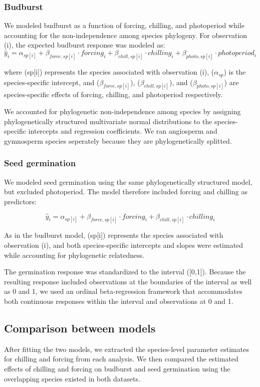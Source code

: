 \documentclass{article}
\begin{document}
\subsubsection{Budburst}
We modeled budburst as a function of forcing, chilling, and photoperiod while accounting for the non-independence among species phylogeny. For observation (i), the expected budburst response was modeled as:
\[
\hat{y}_i = \alpha_{sp[i]} + \beta_{force,sp[i]} \cdot forcing_i + \beta_{chill,sp[i]} \cdot chilling_i + \beta_{photo,sp[i]} \cdot photoperiod_i
\]

where (sp[i]) represents the species associated with observation (i), ($\alpha_{sp}$) is the species-specific intercept, and ($\beta_{force,sp[i]}$), ($\beta_{chill,sp[i]}$), and ($\beta_{photo,sp[i]}$) are species-specific effects of forcing, chilling, and photoperiod respectively.

We accounted for phylogenetic non-independence among species by assigning phylogenetically structured multivariate normal distributions to the species-specific intercepts and regression coefficients. We ran angiosperm and gymnosperm species seperately because they are phylogenetically splitted.

\subsubsection{Seed germination}
We modeled seed germination using the same phylogenetically structured model, but excluded photoperiod. The model therefore included forcing and chilling as predictors:

\[
\hat{y}_i = \alpha_{sp[i]} + \beta_{force,sp[i]} \cdot forcing_i + \beta_{chill,sp[i]} \cdot chilling_i
\]


As in the budburst model, (sp[i]) represents the species associated with observation (i), and both species-specific intercepts and slopes were estimated while accounting for phylogenetic relatedness.

The germination response was standardized to the interval ([0,1]). Because the resulting response included observations at the boundaries of the interval as well as 0 and 1, we used an ordinal beta-regression framework that accommodates both continuous responses within the interval and observations at 0 and 1.

\subsection{Comparison between models}
After fitting the two models, we extracted the species-level parameter estimates for chilling and forcing from each analysis. We then compared the estimated effects of chilling and forcing on budburst and seed germination using the overlapping species existed in both datasets.
\end{document}
